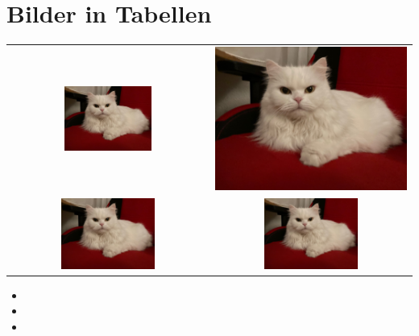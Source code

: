 \documentclass[12pt,ngerman,parskip=half]{scrreprt}
\begin{document}
\blindtext


\chapter{Bilder in Tabellen}

\begin{tabular}{cc}
\includegraphics[width=0.45\textwidth]{Bilder/Katze} & \includegraphics[height=0.4\textwidth]{Bilder/Katze} \\
\includegraphics[width=0.49\textwidth]{Bilder/Katze} & \includegraphics[width=0.49\textwidth]{Bilder/Katze} \\
\end{tabular}


\the\textwidth

\the\linewidth

\the\columnwidth

\begin{itemize}
	\item \the\textwidth
	\item \the\linewidth
	\item \the\columnwidth
\end{itemize}






\end{document}
